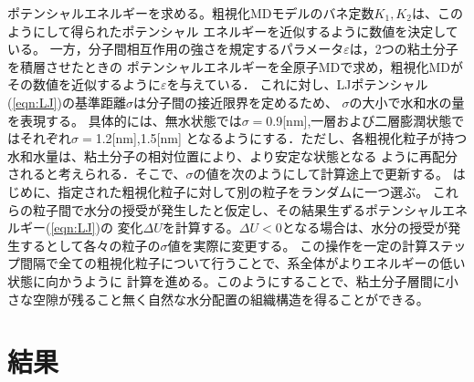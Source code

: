 ﻿\documentclass[11pt,a4j]{jarticle}
\begin{document}
ポテンシャルエネルギーを求める。粗視化MDモデルのバネ定数$K_1, K_2$は、このようにして得られたポテンシャル
エネルギーを近似するように数値を決定している。
一方，分子間相互作用の強さを規定するパラメータ$\varepsilon$は，2つの粘土分子を積層させたときの
ポテンシャルエネルギーを全原子MDで求め，粗視化MDがその数値を近似するように$\varepsilon$を与えている．
これに対し、LJポテンシャル(\ref{eqn:LJ})の基準距離$\sigma$は分子間の接近限界を定めるため、
$\sigma$の大小で水和水の量を表現する。
具体的には、無水状態では$\sigma=$0.9[nm],一層および二層膨潤状態ではそれぞれ$\sigma=$1.2[nm],1.5[nm]
となるようにする．ただし、各粗視化粒子が持つ水和水量は、粘土分子の相対位置により、より安定な状態となる
ように再配分されると考えられる．そこで、$\sigma$の値を次のようにして計算途上で更新する。
はじめに、指定された粗視化粒子に対して別の粒子をランダムに一つ選ぶ。
これらの粒子間で水分の授受が発生したと仮定し、その結果生ずるポテンシャルエネルギー(\ref{eqn:LJ})の
変化$\Delta U$を計算する。$\Delta U<0$となる場合は、水分の授受が発生するとして各々の粒子の$\sigma$値を実際に変更する。
この操作を一定の計算ステップ間隔で全ての粗視化粒子について行うことで、系全体がよりエネルギーの低い状態に向かうように
計算を進める。このようにすることで、粘土分子層間に小さな空隙が残ること無く自然な水分配置の組織構造を得ることができる。
\section{結果}
\end{document}
